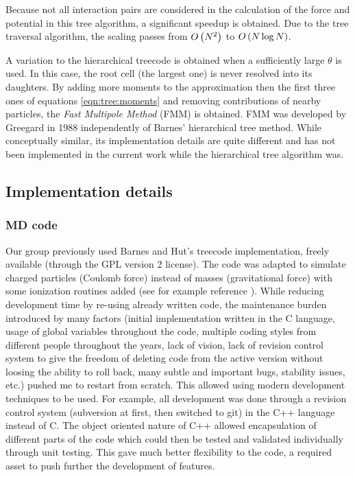 Because not all interaction pairs are considered in the calculation of the
force and potential in this tree algorithm,
a significant speedup is obtained. Due to the tree
traversal algorithm, the scaling passes
from $O\left( N^2 \right)$ to $O\left( N \log{N} \right)$\cite{Barnes1986,Gibbon2002,Pfalzner1996}.

A variation to the hierarchical treecode is obtained when a sufficiently large
$\theta$ is used. In this case, the root cell (the largest one) is never
resolved into its daughters. By adding more moments to the approximation then
the first three ones of equations \eqref{eqn:tree:moments} and removing
contributions of nearby particles, the \textit{Fast Multipole Method} (FMM) is
obtained\cite{Pfalzner1996}. FMM was developed by Greegard in
1988\cite{Greengard1987} independently of Barnes' hierarchical tree method.
While conceptually similar, its implementation details are quite different and
has not been implemented in the current work while the hierarchical tree
algorithm was.



\subsection{Implementation details}

\subsubsection{MD code}

Our group previously used Barnes and Hut's treecode implementation,
freely available\cite{treecode} (through the GPL version 2 license). The code was adapted
to simulate charged particles (Coulomb force) instead of masses (gravitational
force) with some ionization routines added (see for example reference
\cite{Jungreuthmayer2005}). While reducing development time by re-using already
written code, the maintenance burden introduced by many factors (initial
implementation written in the C language, usage of global variables
throughout the code, multiple coding styles from different people throughout
the years, lack of vision, lack of revision control system to give the freedom
of deleting code from the active version without loosing the ability to roll
back, many subtle and important bugs, stability issues, etc.) pushed me
to restart from scratch. This allowed using modern development techniques to be
used. For example, all development was done through a revision control system
(subversion\cite{svn} at first, then switched to git\cite{git}) in the C++
language instead of C. The object oriented nature of C++ allowed encapsulation
of different parts of the code which could then be tested and validated
individually through unit testing. This gave much better flexibility to the
code, a required asset to
push further the development of features.

